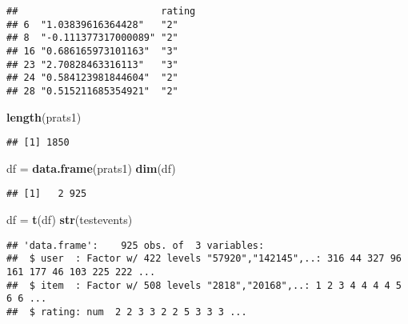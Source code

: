 \documentclass[]{article}
\newenvironment{Shaded}{\begin{snugshade}}{\end{snugshade}}
\newcommand{\DecValTok}[1]{\textcolor[rgb]{0.00,0.00,0.81}{#1}}
\newcommand{\KeywordTok}[1]{\textcolor[rgb]{0.13,0.29,0.53}{\textbf{#1}}}
\newcommand{\NormalTok}[1]{#1}
\newcommand{\OperatorTok}[1]{\textcolor[rgb]{0.81,0.36,0.00}{\textbf{#1}}}
\newcommand{\StringTok}[1]{\textcolor[rgb]{0.31,0.60,0.02}{#1}}
\begin{document}
\begin{verbatim}
##                         rating
## 6  "1.03839616364428"   "2"   
## 8  "-0.111377317000089" "2"   
## 16 "0.686165973101163"  "3"   
## 23 "2.70828463316113"   "3"   
## 24 "0.584123981844604"  "2"   
## 28 "0.515211685354921"  "2"
\end{verbatim}

\begin{Shaded}
\begin{Highlighting}[]
\KeywordTok{length}\NormalTok{(prats1)}
\end{Highlighting}
\end{Shaded}

\begin{verbatim}
## [1] 1850
\end{verbatim}

\begin{Shaded}
\begin{Highlighting}[]
\NormalTok{df =}\StringTok{ }\KeywordTok{data.frame}\NormalTok{(prats1)}
\KeywordTok{dim}\NormalTok{(df)}
\end{Highlighting}
\end{Shaded}

\begin{verbatim}
## [1]   2 925
\end{verbatim}

\begin{Shaded}
\begin{Highlighting}[]
\NormalTok{df =}\StringTok{ }\KeywordTok{t}\NormalTok{(df)}
\KeywordTok{str}\NormalTok{(testevents)}
\end{Highlighting}
\end{Shaded}

\begin{verbatim}
## 'data.frame':    925 obs. of  3 variables:
##  $ user  : Factor w/ 422 levels "57920","142145",..: 316 44 327 96 161 177 46 103 225 222 ...
##  $ item  : Factor w/ 508 levels "2818","20168",..: 1 2 3 4 4 4 4 5 6 6 ...
##  $ rating: num  2 2 3 3 2 2 5 3 3 3 ...
\end{verbatim}

\begin{Shaded}
\end{Shaded}
\end{document}
